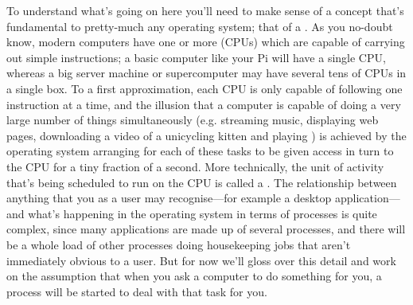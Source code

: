 To understand what's going on here you'll need to make sense of a concept that's fundamental to pretty-much any operating system; that of a . As you no-doubt know, modern computers have one or more  (CPUs) which are capable of carrying out simple instructions; a basic computer like your Pi will have a single CPU, whereas a big server machine or supercomputer may have several tens of CPUs in a single box. To a first approximation, each CPU is only capable of following one instruction at a time, and the illusion that a computer is capable of doing a very large number of things simultaneously (e.g. streaming music, displaying web pages, downloading a video of a unicycling kitten and playing ) is achieved by the operating system arranging for each of these tasks to be given access in turn to the CPU for a tiny fraction of a second. More technically, the unit of activity that's being scheduled to run on the CPU is called a . The relationship between anything that you as a user may recognise---for example a desktop application---and what's happening in the operating system in terms of processes is quite complex, since many applications are made up of several processes, and there will be a whole load of other processes doing housekeeping jobs that aren't immediately obvious to a user. But for now we'll gloss over this detail and work on the assumption that when you ask a computer to do something for you, a process will be started to deal with that task for you. 


